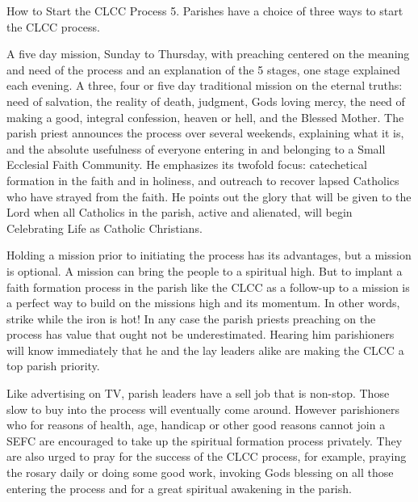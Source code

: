 \documentclass[oneside]{book}
\begin{document}
How to Start the CLCC Process 5. Parishes have a choice of three ways to start
the CLCC process.

A five day mission, Sunday to Thursday, with preaching centered on the meaning
and need of the process and an explanation of the 5 stages, one stage explained
each evening.  A three, four or five day traditional mission on the eternal
truths: need of salvation, the reality of death, judgment, Gods loving mercy,
the need of making a good, integral confession, heaven or hell, and the Blessed
Mother.  The parish priest announces the process over several weekends,
explaining what it is, and the absolute usefulness of everyone entering in and
belonging to a Small Ecclesial Faith Community. He emphasizes its twofold focus:
catechetical formation in the faith and in holiness, and outreach to recover
lapsed Catholics who have strayed from the faith. He points out the glory that
will be given to the Lord when all Catholics in the parish, active and
alienated, will begin Celebrating Life as Catholic Christians.

Holding a mission prior to initiating the process has its advantages, but a
mission is optional. A mission can bring the people to a spiritual high. But to
implant a faith formation process in the parish like the CLCC as a follow-up to
a mission is a perfect way to build on the missions high and its momentum. In
other words, strike while the iron is hot! In any case the parish priests
preaching on the process has value that ought not be underestimated. Hearing him
parishioners will know immediately that he and the lay leaders alike are making
the CLCC a top parish priority.

Like advertising on TV, parish leaders have a sell job that is non-stop. Those
slow to buy into the process will eventually come around. However parishioners
who for reasons of health, age, handicap or other good reasons cannot join a
SEFC are encouraged to take up the spiritual formation process privately. They
are also urged to pray for the success of the CLCC process, for example, praying
the rosary daily or doing some good work, invoking Gods blessing on all those
entering the process and for a great spiritual awakening in the parish.
\end{document}
